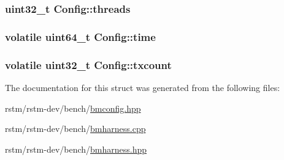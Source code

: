 \hypertarget{structConfig_a870c958ae8404dd3942c3769f5a43e15}{
\subsubsection[{threads}]{\setlength{\rightskip}{0pt plus 5cm}uint32\-\_\-t Config\-::threads}}\label{structConfig_a870c958ae8404dd3942c3769f5a43e15}
\hypertarget{structConfig_a951db08a5d4bd2805fdc5a1e10171831}{
\subsubsection[{time}]{\setlength{\rightskip}{0pt plus 5cm}volatile uint64\-\_\-t Config\-::time}}\label{structConfig_a951db08a5d4bd2805fdc5a1e10171831}
\hypertarget{structConfig_a2bd671f1afa6a6cf33a85f783ef9ae9f}{
\subsubsection[{txcount}]{\setlength{\rightskip}{0pt plus 5cm}volatile uint32\-\_\-t Config\-::txcount}}\label{structConfig_a2bd671f1afa6a6cf33a85f783ef9ae9f}


The documentation for this struct was generated from the following files\-:\begin{DoxyCompactItemize}
\item 
rstm/rstm-\/dev/bench/\hyperlink{bmconfig_8hpp}{bmconfig.\-hpp}\item 
rstm/rstm-\/dev/bench/\hyperlink{bmharness_8cpp}{bmharness.\-cpp}\item 
rstm/rstm-\/dev/bench/\hyperlink{bmharness_8hpp}{bmharness.\-hpp}\end{DoxyCompactItemize}
